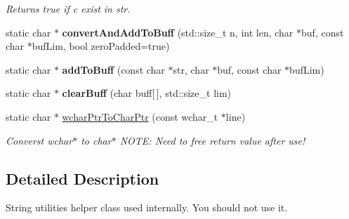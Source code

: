 \begin{DoxyCompactItemize}
\begin{DoxyCompactList}\small\item\em Returns true if c exist in str. \end{DoxyCompactList}\item 
\hypertarget{classel_1_1base_1_1utils_1_1Str_a5e12c163bf1085441ea5453fd6c62fa0}{static char $\ast$ {\bfseries convert\-And\-Add\-To\-Buff} (std\-::size\-\_\-t n, int len, char $\ast$buf, const char $\ast$buf\-Lim, bool zero\-Padded=true)}\label{classel_1_1base_1_1utils_1_1Str_a5e12c163bf1085441ea5453fd6c62fa0}

\item 
\hypertarget{classel_1_1base_1_1utils_1_1Str_aa6a96f625f71661c02ecd5366533abaa}{static char $\ast$ {\bfseries add\-To\-Buff} (const char $\ast$str, char $\ast$buf, const char $\ast$buf\-Lim)}\label{classel_1_1base_1_1utils_1_1Str_aa6a96f625f71661c02ecd5366533abaa}

\item 
\hypertarget{classel_1_1base_1_1utils_1_1Str_adf0c36c9b8276ede18111a866e31db8b}{static char $\ast$ {\bfseries clear\-Buff} (char buff\mbox{[}$\,$\mbox{]}, std\-::size\-\_\-t lim)}\label{classel_1_1base_1_1utils_1_1Str_adf0c36c9b8276ede18111a866e31db8b}

\item 
\hypertarget{classel_1_1base_1_1utils_1_1Str_a6dc022e7e8d4cbf2c80ba9e1354feaea}{static char $\ast$ \hyperlink{classel_1_1base_1_1utils_1_1Str_a6dc022e7e8d4cbf2c80ba9e1354feaea}{wchar\-Ptr\-To\-Char\-Ptr} (const wchar\-\_\-t $\ast$line)}\label{classel_1_1base_1_1utils_1_1Str_a6dc022e7e8d4cbf2c80ba9e1354feaea}

\begin{DoxyCompactList}\small\item\em Converst wchar$\ast$ to char$\ast$ N\-O\-T\-E\-: Need to free return value after use! \end{DoxyCompactList}\end{DoxyCompactItemize}


\subsection{Detailed Description}
String utilities helper class used internally. You should not use it. 

